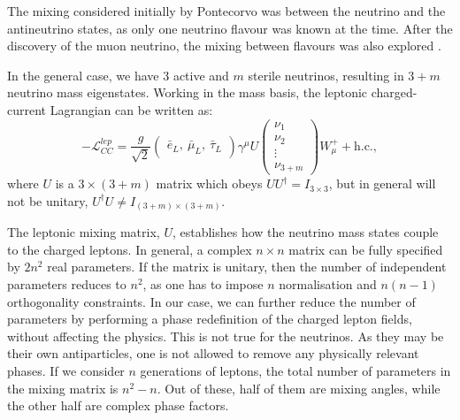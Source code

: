 The mixing considered initially by Pontecorvo was between the neutrino and the antineutrino states, as only one neutrino flavour was known at the time. After the discovery of the muon neutrino, the mixing between flavours was also explored \cite{Pontecorvo1967}.

In the general case, we have $3$ active and $m$ sterile neutrinos, resulting in $3+m$ neutrino mass eigenstates. Working in the mass basis, the leptonic charged-current Lagrangian can be written as:
\begin{equation}
	-\mathcal{L}_{CC}^{lep} = \frac{g}{\sqrt{2}} \begin{pmatrix}\bar{e}_{L},~ \bar{\mu}_{L},~ \bar{\tau}_{L}\end{pmatrix} \gamma^{\mu} U \begin{pmatrix}\nu_{1}\\\nu_{2}\\\vdots\\\nu_{3+m}\end{pmatrix} W_{\mu}^{+} + \mathrm{h.c.},
\end{equation}
where $U$ is a $3\times(3+m)$ matrix which obeys $UU^{\dagger} = I_{3 \times 3}$, but in general will not be unitary, $U^{\dagger}U\neq I_{(3+m) \times (3+m)}$.

The leptonic mixing matrix, $U$, establishes how the neutrino mass states couple to the charged leptons. In general, a complex $n \times n$ matrix can be fully specified by $2n^{2}$ real parameters. If the matrix is unitary, then the number of independent parameters reduces to $n^{2}$, as one has to impose $n$ normalisation and $n(n-1)$ orthogonality constraints. In our case, we can further reduce the number of parameters by performing a phase redefinition of the charged lepton fields, without affecting the physics. This is not true for the neutrinos. As they may be their own antiparticles, one is not allowed to remove any physically relevant phases. If we consider $n$ generations of leptons, the total number of parameters in the mixing matrix is $n^{2}-n$. Out of these, half of them are mixing angles, while the other half are complex phase factors.

